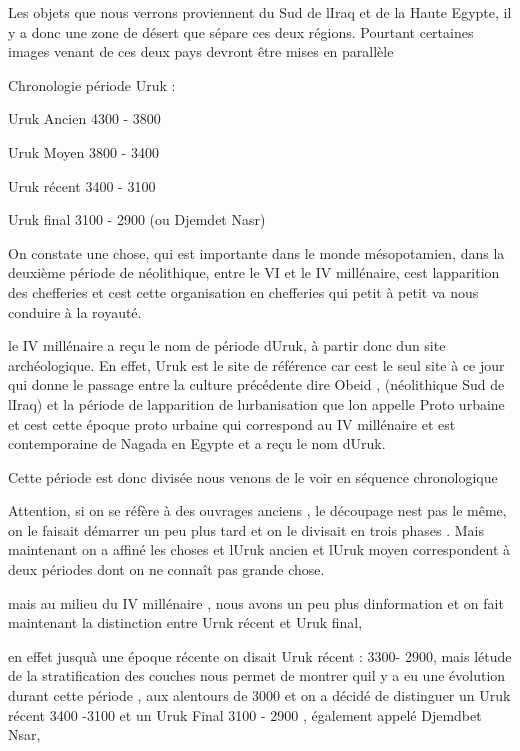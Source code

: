 \documentclass{article}
\begin{document}
Les objets que nous verrons proviennent du Sud de
l{\textquotesingle}Iraq et de la Haute Egypte, il y a donc une zone de
désert que sépare ces deux régions. Pourtant certaines images venant de
ces deux pays devront être mises en parallèle

Chronologie période Uruk : 

Uruk Ancien 4300 - 3800

Uruk Moyen 3800 - 3400

Uruk récent  3400 - 3100

Uruk final  3100 - 2900 (ou Djemdet Nasr)

On constate une chose, qui est importante dans le monde mésopotamien,
dans la deuxième période de néolithique, entre le VI et le IV
millénaire, c{\textquotesingle}est l{\textquotesingle}apparition des
chefferies et c{\textquotesingle}est cette organisation en chefferies
qui petit à petit va nous conduire à la royauté.

le IV millénaire a reçu le nom de période d{\textquotesingle}Uruk,  à
partir donc d{\textquotesingle}un site archéologique. En effet, Uruk
est le site de référence car c{\textquotesingle}est le seul site à ce
jour qui donne le passage entre la culture précédente dire Obeid ,
(néolithique Sud de l{\textquotesingle}Iraq) et la période de
l{\textquotesingle}apparition de l{\textquotesingle}urbanisation que
l{\textquotesingle}on appelle Proto  urbaine et c{\textquotesingle}est
cette époque proto urbaine qui correspond au IV millénaire et est
contemporaine de Nagada en Egypte et a reçu le nom
d{\textquotesingle}Uruk.

Cette période est donc divisée nous venons de le voir en séquence
chronologique

Attention, si on se réfère à des ouvrages anciens , le découpage
n{\textquotesingle}est pas le même, on le faisait démarrer un peu plus
tard et on le divisait en trois phases . Mais maintenant on a affiné
les choses et l{\textquotesingle}Uruk ancien et l{\textquotesingle}Uruk
 moyen correspondent à deux périodes dont on ne connaît pas grande
chose.

mais au milieu du IV millénaire , nous avons un peu plus
d{\textquotesingle}information et on fait maintenant la distinction
entre Uruk récent et Uruk final,

en effet jusqu{\textquotesingle}à une époque récente on disait Uruk
récent : 3300- 2900, mais l{\textquotesingle}étude de la stratification
des couches nous permet de montrer qu{\textquotesingle}il y a eu une
évolution durant cette période , aux alentours de 3000 et on a décidé
de distinguer un Uruk récent 3400 -3100 et un Uruk Final 3100 - 2900 ,
également appelé Djemdbet Nsar, 
\end{document}
